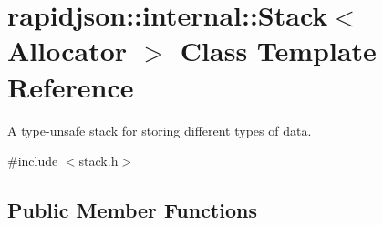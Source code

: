 \hypertarget{classrapidjson_1_1internal_1_1_stack}{}\section{rapidjson\+::internal\+::Stack$<$ Allocator $>$ Class Template Reference}
\label{classrapidjson_1_1internal_1_1_stack}


A type-\/unsafe stack for storing different types of data.  




{\ttfamily \#include $<$stack.\+h$>$}

\subsection*{Public Member Functions}
